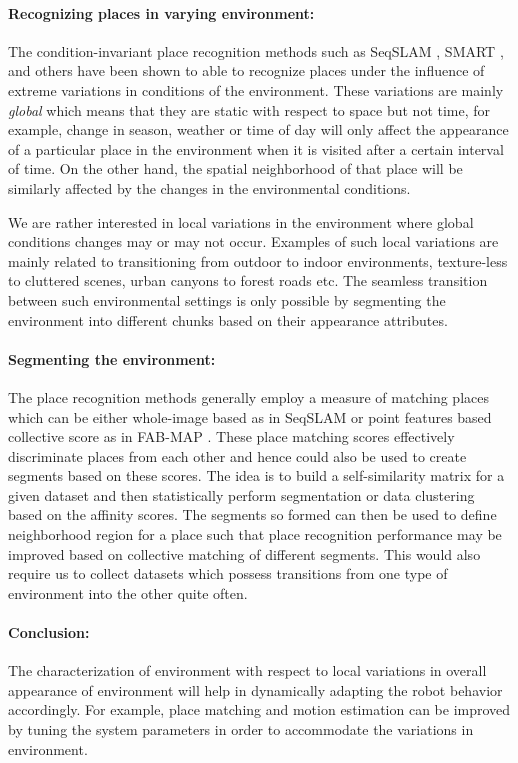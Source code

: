\documentclass{article}
\begin{document}
\paragraph{Recognizing places in varying environment:}The condition-invariant place recognition methods such as SeqSLAM \cite{Milford2012}, SMART \cite{Pepperell2014}, and others \cite{Naseer2014,Niko2015,Maddern} have been shown to able to recognize places under the influence of extreme variations in conditions of the environment. These variations are mainly \emph{global} which means that they are static with respect to space but not time, for example, change in season, weather or time of day will only affect the appearance of a particular place in the environment when it is visited after a certain interval of time. On the other hand, the spatial neighborhood of that place will be similarly affected by the changes in the environmental conditions. 

We are rather interested in local variations in the environment where global conditions changes may or may not occur. Examples of such local variations are mainly related to transitioning from outdoor to indoor environments, texture-less to cluttered scenes, urban canyons to forest roads etc. The seamless transition between such environmental settings is only possible by segmenting the environment into different chunks based on their appearance attributes.

\paragraph{Segmenting the environment:}The place recognition methods generally employ a measure of matching places which can be either whole-image based as in SeqSLAM \cite{Milford2012} or point features based collective score as in FAB-MAP \cite{Cummins2009}. These place matching scores effectively discriminate places from each other and hence could also be used to create segments based on these scores. The idea is to build a self-similarity matrix for a given dataset and then statistically perform segmentation or data clustering based on the affinity scores. The segments so formed can then be used to define neighborhood region for a place such that place recognition performance may be improved based on collective matching of different segments. This would also require us to collect datasets which possess transitions from one type of environment into the other quite often.

\paragraph{Conclusion:}The characterization of environment with respect to local variations in overall appearance of environment will help in dynamically adapting the robot behavior accordingly. For example, place matching and motion estimation can be improved by tuning the system parameters in order to accommodate the variations in environment.
\end{document}
